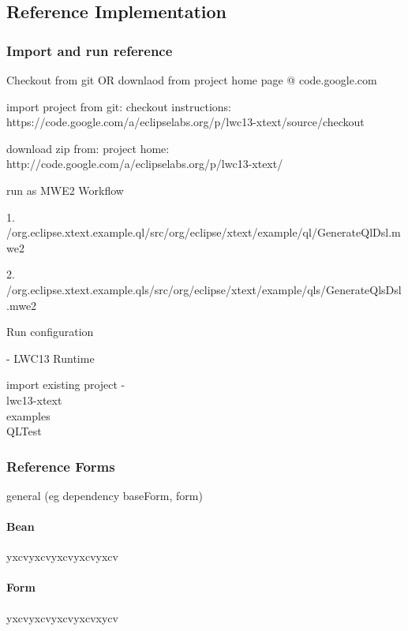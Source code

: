 \subsection{Reference Implementation}





\subsubsection{Import and run reference}

Checkout from git OR downlaod from project home page @ code.google.com

import project from git:
checkout instructions:
https://code.google.com/a/eclipselabs.org/p/lwc13-xtext/source/checkout

download zip from:
project home: http://code.google.com/a/eclipselabs.org/p/lwc13-xtext/

run as MWE2 Workflow

1. /org.eclipse.xtext.example.ql/src/org/eclipse/xtext/example/ql/GenerateQlDsl.mwe2

2. /org.eclipse.xtext.example.qls/src/org/eclipse/xtext/example/qls/GenerateQlsDsl.mwe2

Run configuration

- LWC13 Runtime

import existing project
- \\lwc13-xtext\\examples\\QLTest



\subsubsection{Reference Forms}
\label{subsec:referenceForms}
general (eg dependency baseForm, form)

\paragraph{Bean}
yxcvyxcvyxcvyxcvyxcv

\paragraph{Form}
yxcvyxcvyxcvyxcvxycv



